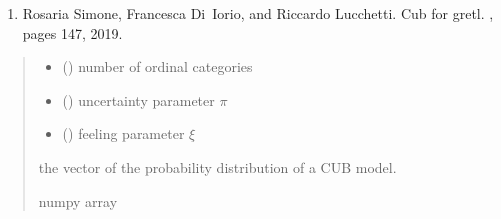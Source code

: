 \documentclass[letterpaper,10pt,english]{sphinxmanual}
\begin{document}
\begin{fulllineitems}
\begin{description}
\begin{enumerate}
\item {} 
\sphinxAtStartPar
Rosaria Simone, Francesca Di Iorio, and Riccardo Lucchetti. Cub for gretl. , pages 147, 2019.

\end{enumerate}

\end{description}
\begin{quote}\begin{description}
\begin{itemize}
\item {} 
\sphinxAtStartPar
{} () \textendash{} number of ordinal categories

\item {} 
\sphinxAtStartPar
{} () \textendash{} uncertainty parameter \(\pi\)

\item {} 
\sphinxAtStartPar
{} () \textendash{} feeling parameter \(\xi\)

\end{itemize}

\sphinxAtStartPar
the vector of the probability distribution of a CUB model.

\sphinxAtStartPar
numpy array

\end{description}\end{quote}

\end{fulllineitems}

\end{document}

